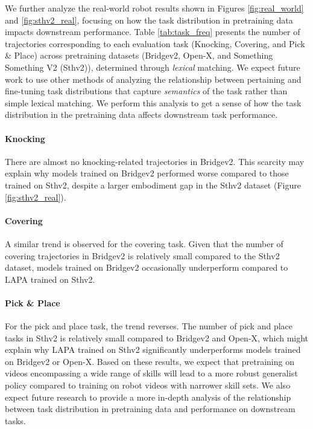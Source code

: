 \documentclass{article} %
\begin{document}
We further analyze the real-world robot results shown in Figures \ref{fig:real_world} and \ref{fig:sthv2_real}, focusing on how the task distribution in pretraining data impacts downstream performance.
Table \ref{tab:task_freq} presents the number of trajectories corresponding to each evaluation task (Knocking, Covering, and Pick \& Place) across pretraining datasets (Bridgev2, Open-X, and Something Something V2 (Sthv2)), determined through \textit{lexical} matching. We expect future work to use other methods of analyzing the relationship between pertaining and fine-tuning task distributions that capture \textit{semantics} of the task rather than simple lexical matching. We perform this analysis to get a sense of how the task distribution in the pretraining data affects downstream task performance. 

\paragraph{Knocking} There are almost no knocking-related trajectories in Bridgev2. This scarcity may explain why models trained on Bridgev2 performed worse compared to those trained on Sthv2, despite a larger embodiment gap in the Sthv2 dataset (Figure \ref{fig:sthv2_real}).

\paragraph{Covering} A similar trend is observed for the covering task. Given that the number of covering trajectories in Bridgev2 is relatively small compared to the Sthv2 dataset, models trained on Bridgev2 occasionally underperform compared to LAPA trained on Sthv2. 

\paragraph{Pick \& Place} For the pick and place task, the trend reverses. The number of pick and place tasks in Sthv2 is relatively small compared to Bridgev2 and Open-X, which might explain why LAPA trained on Sthv2 significantly underperforms models trained on Bridgev2 or Open-X. Based on these results, we expect that pretraining on videos encompassing a wide range of skills will lead to a more robust generalist policy compared to training on robot videos with narrower skill sets. We also expect future research to provide a more in-depth analysis of the relationship between task distribution in pretraining data and performance on downstream tasks.
\end{document}
